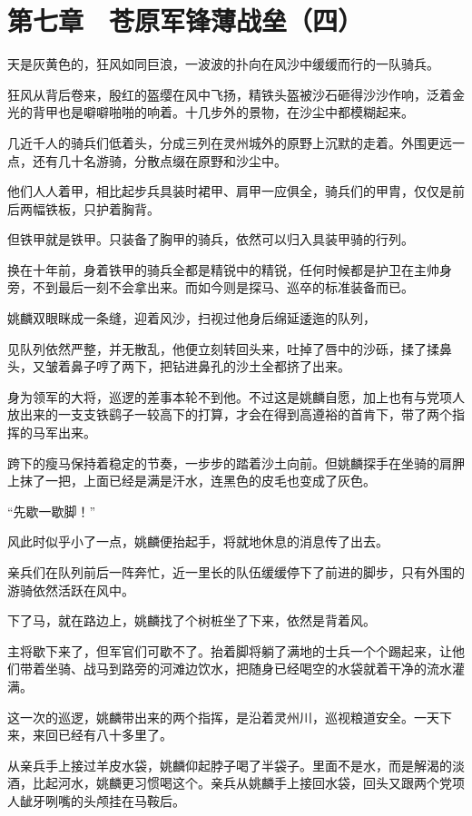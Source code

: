 \section{第七章　苍原军锋薄战垒（四）}

天是灰黄色的，狂风如同巨浪，一波波的扑向在风沙中缓缓而行的一队骑兵。

狂风从背后卷来，殷红的盔缨在风中飞扬，精铁头盔被沙石砸得沙沙作响，泛着金光的背甲也是噼噼啪啪的响着。十几步外的景物，在沙尘中都模糊起来。

几近千人的骑兵们低着头，分成三列在灵州城外的原野上沉默的走着。外围更远一点，还有几十名游骑，分散点缀在原野和沙尘中。

他们人人着甲，相比起步兵具装时裙甲、肩甲一应俱全，骑兵们的甲胄，仅仅是前后两幅铁板，只护着胸背。

但铁甲就是铁甲。只装备了胸甲的骑兵，依然可以归入具装甲骑的行列。

换在十年前，身着铁甲的骑兵全都是精锐中的精锐，任何时候都是护卫在主帅身旁，不到最后一刻不会拿出来。而如今则是探马、巡卒的标准装备而已。

姚麟双眼眯成一条缝，迎着风沙，扫视过他身后绵延逶迤的队列，

见队列依然严整，并无散乱，他便立刻转回头来，吐掉了唇中的沙砾，揉了揉鼻头，又皱着鼻子哼了两下，把钻进鼻孔的沙土全都挤了出来。

身为领军的大将，巡逻的差事本轮不到他。不过这是姚麟自愿，加上也有与党项人放出来的一支支铁鹞子一较高下的打算，才会在得到高遵裕的首肯下，带了两个指挥的马军出来。

跨下的瘦马保持着稳定的节奏，一步步的踏着沙土向前。但姚麟探手在坐骑的肩胛上抹了一把，上面已经是满是汗水，连黑色的皮毛也变成了灰色。

“先歇一歇脚！”

风此时似乎小了一点，姚麟便抬起手，将就地休息的消息传了出去。

亲兵们在队列前后一阵奔忙，近一里长的队伍缓缓停下了前进的脚步，只有外围的游骑依然活跃在风中。

下了马，就在路边上，姚麟找了个树桩坐了下来，依然是背着风。

主将歇下来了，但军官们可歇不了。抬着脚将躺了满地的士兵一个个踢起来，让他们带着坐骑、战马到路旁的河滩边饮水，把随身已经喝空的水袋就着干净的流水灌满。

这一次的巡逻，姚麟带出来的两个指挥，是沿着灵州川，巡视粮道安全。一天下来，来回已经有八十多里了。

从亲兵手上接过羊皮水袋，姚麟仰起脖子喝了半袋子。里面不是水，而是解渴的淡酒，比起河水，姚麟更习惯喝这个。亲兵从姚麟手上接回水袋，回头又跟两个党项人龇牙咧嘴的头颅挂在马鞍后。

